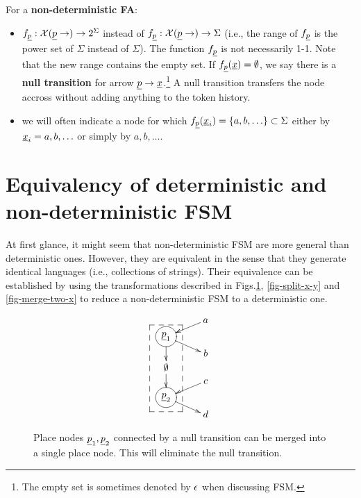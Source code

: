 \begin{mdframed}[hidealllines=true,backgroundcolor=blue!10]
For a {\bf non-deterministic FA}:
\begin{itemize}
\item
$f_\rvp:\calx(\rvp\rarrow)\rarrow 2^\Sigma$ 
instead of 
$f_\rvp:\calx(\rvp\rarrow)\rarrow \Sigma$ (i.e., the range of $f_\rvp$
is the power set of $\Sigma$ 
instead of $\Sigma$).
The function $f_\rvp$ is not necessarily
1-1.
Note that the new range contains the empty set.
If $f_\rvp(\rvx)=\emptyset$, we say there is a  {\bf null transition} for arrow 
$\rvp\rarrow \rvx$.\footnote{The empty set is sometimes denoted by $\epsilon$ 
when discussing FSM.} A null transition 
transfers the node accross without adding anything to the token history. 
\item
we will often indicate a node for 
which $f_{\rvp}(\rvx_i)=\{a,b, \ldots\}\subset\Sigma$ either by $\rvx_i=a, b, \ldots$
or simply by $a, b, \ldots$. 
\end{itemize}\end{mdframed}

\section{Equivalency of deterministic and non-deterministic FSM}

At first glance, it might
seem that non-deterministic FSM
are more general than  deterministic ones.
However, they are equivalent
in the sense that they generate identical languages (i.e., collections of strings). Their equivalence can be
established by using the transformations described in Figs.\ref{fig-shrink-null-tra},
\ref{fig-split-x-y}
and \ref{fig-merge-two-x}
to reduce  a non-deterministic FSM
to a deterministic one.


\begin{figure}[h!]
$$
\xymatrix@R=.1pc{
& a\ar[dl]
\\
\Circle{\rvp_1}\ar[rd]
\ar[dd]
\\
& b
\\
\emptyset\ar[dd]
\\
&c\ar[dl]
\\
\Circle{\rvp_2}\ar[rd]
\\
&d
\save "2,1"."6,1"*++[F--]\frm{}
\restore
}
$$
\caption{Place nodes $\rvp_1, \rvp_2$ connected by
a null transition can be merged into a single
place node. This will eliminate the null transition.}
\label{fig-shrink-null-tra}
\end{figure}

